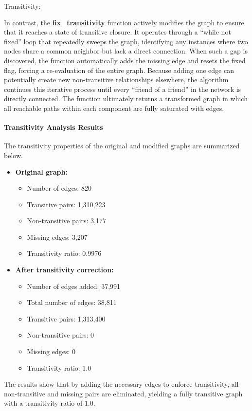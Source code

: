 \begin{question}
\begin{subquestion}{Transitivity:}
{			In contrast, the \textbf{fix\_transitivity} function actively modifies the graph to ensure that it reaches a state of transitive closure. It operates through a ``while not fixed'' loop that repeatedly sweeps the graph, identifying any instances where two nodes share a common neighbor but lack a direct connection. When such a gap is discovered, the function automatically adds the missing edge and resets the fixed flag, forcing a re-evaluation of the entire graph. Because adding one edge can potentially create new non-transitive relationships elsewhere, the algorithm continues this iterative process until every ``friend of a friend'' in the network is directly connected. The function ultimately returns a transformed graph in which all reachable paths within each component are fully saturated with edges.
			
			\paragraph{Transitivity Analysis Results}
			The transitivity properties of the original and modified graphs are summarized below.
			
			\begin{itemize}
				\item \textbf{Original graph:}
				\begin{itemize}
					\item Number of edges: 820
					\item Transitive pairs: 1,310,223
					\item Non-transitive pairs: 3,177
					\item Missing edges: 3,207
					\item Transitivity ratio: 0.9976
				\end{itemize}
				
				\item \textbf{After transitivity correction:}
				\begin{itemize}
					\item Number of edges added: 37,991
					\item Total number of edges: 38,811
					\item Transitive pairs: 1,313,400
					\item Non-transitive pairs: 0
					\item Missing edges: 0
					\item Transitivity ratio: 1.0
				\end{itemize}
			\end{itemize}
			
			The results show that by adding the necessary edges to enforce transitivity, all non-transitive and missing pairs are eliminated, yielding a fully transitive graph with a transitivity ratio of 1.0.
		}
		
	\end{subquestion}
\end{question}